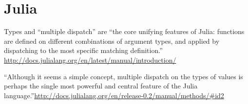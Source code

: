 \chapter{Julia}


Types and ``multiple dispatch'' are ``the core unifying features of
Julia: functions are defined on different combinations of argument
types, and applied by dispatching to the most specific matching
definition.'' \url{http://docs.julialang.org/en/latest/manual/introduction/}


``Although it seems a simple concept, multiple dispatch on the types of values is perhaps the single most powerful and central feature of the Julia language.''\url{http://docs.julialang.org/en/release-0.2/manual/methods/#id2}
